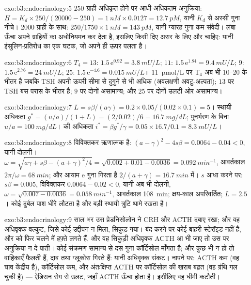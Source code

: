 \begin{solution}{exo:b3:endocrinology:5}
$250$ ग्राही अधिकृत होने पर आधी-अधिकतम अनुक्रिया: $H = K_{d}\times
250/(\num{20000} - 250) = \qty{1}{nM}\times 0.0127 = \qty{12.7}{pM}$,
यानी $K_{d}$ से अस्सी गुना नीचे। \num{2000} ग्राही के साथ: $250/1750
\times \qty{1}{nM} = \qty{143}{pM}$, यानी ग्यारह गुना कम संवेदी।
लंबा ऊँचा  अपने ग्राहियों का अधोनियमन कर देता है, इसलिए किसी दिए
असर के लिए और  चाहिए: यानी इंसुलिन-प्रतिरोध का एक घटक, जो अपने
ही ऊपर पलता है।
\end{solution}

\begin{solution}{exo:b3:endocrinology:6}
$T_{4} = 13$: $1.5\,\mathrm{e}^{0.92} = \qty{3.8}{mU/L}$; $11$:
$1.5\,\mathrm{e}^{1.84} = \qty{9.4}{mU/L}$; $9$: $1.5\,\mathrm{e}^{2.76}
= \qty{24}{mU/L}$; $25$: $1.5\,\mathrm{e}^{-4.6} = \qty{0.015}{mU/L}$।
\qty{11}{pmol/L} पर T$_{4}$ अब भी \qtyrange{10}{20}{} के भीतर है जबकि
TSH अपनी ऊपरी सीमा से दुगुने से भी अधिक (अवलक्षणी अवटु-अल्पता);
$13$ पर TSH बस परास के भीतर है; $9$ पर दोनों असामान्य; और $25$ पर
दोनों उलटी ओर असामान्य।
\end{solution}

\begin{solution}{exo:b3:endocrinology:7}
$L = s\beta/(a\gamma) = 0.2\times 0.05/(0.02\times 0.1) = 5$। स्थायी
अधिकता $g^{*} = (u/a)/(1 + L) = (2/0.02)/6 = \qty{16.7}{mg/dL}$;
पुनर्भरण के बिना $u/a = \qty{100}{mg/dL}$।  की अधिकता
$i^{*} = \beta g^{*}/
\gamma = 0.05\times 16.7/0.1 = \qty{8.3}{mU/L}$।
\end{solution}

\begin{solution}{exo:b3:endocrinology:8}
विविक्तकर ऋणात्मक है: $(a - \gamma)^{2} - 4s\beta = 0.0064 - 0.04 < 0$,
यानी दोलनी।
$\omega = \sqrt{a\gamma + s\beta - (a+\gamma)^{2}/4} =
\sqrt{0.002 + 0.01 - 0.0036} = \qty{0.092}{min^{-1}}$, आवर्तकाल $2\pi/
\omega = \qty{68}{min}$; और आयाम $\mathrm{e}$ गुना गिरता है $2/(a +
\gamma) = \qty{16.7}{min}$ में। $s$ आधा करने पर: $s\beta = 0.005$,
विविक्तकर $0.0064 - 0.02 < 0$, यानी अब भी दोलनी, $\omega = \sqrt{0.007 - 0.0036}
= \qty{0.058}{min^{-1}}$, आवर्तकाल \qty{108}{min}; क्षय-काल
अपरिवर्तित; $L = 2.5$। कोई दुर्बल पाश धीरे लौटता है और बड़ी स्थायी
त्रुटि थामे रखता है।
\end{solution}

\begin{solution}{exo:b3:endocrinology:9}
साल भर उस प्रेडनिसोलोन ने CRH और ACTH दबाए रखा; और वह अधिवृक्क वल्कुट,
जिसे कोई उद्दीपन न मिला, सिकुड़ गया। बंद करने पर कोई बाहरी स्टेरॉइड
नहीं है,  और  को फिर चलने में हफ़्ते लगते हैं, और वह सिकुड़ी
अधिवृक्क ACTH आ भी जाए तो उस पर अनुक्रिया न दे पाती। कोई संक्रमण
सामान्य से दस गुना कॉर्टिसोल माँगता है; और कुछ भी न हो तो वाहिकाएँ
फैलती हैं, दाब तथा ग्लूकोस गिरते हैं: यानी अधिवृक्क संकट। नापने पर:
ACTH कम (वह घाव केंद्रीय है), कॉर्टिसोल कम, और अंतःक्षिप्त ACTH पर
कॉर्टिसोल की खराब बढ़त (वह ग्रंथि गल चुकी है) --- ऐडिसन रोग से उलट,
जहाँ ACTH ऊँचा होता है। इसीलिए वह धीमी कटौती।
\end{solution}

